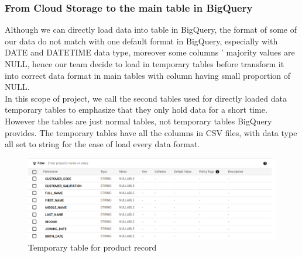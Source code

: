 \subsubsection{From Cloud Storage to the main table in BigQuery}
Although we can directly load data into table in BigQuery, the format of some of our data do not match with one default format in BigQuery, especially with DATE and DATETIME data type, moreover some columns ' majority values are NULL, hence our team decide to load in temporary tables before transform it into correct data format in main tables with column having small proportion of NULL.\\
In this scope of project, we call the second tables used for directly loaded data temporary tables to emphasize that they only hold data for a short time. However the tables are just normal tables, not temporary tables BigQuery provides. The temporary tables have all the columns in CSV files, with data type all set to string for the ease of load every data format. 
\begin{figure}[!h]
    \centering
    \includegraphics[width=0.75\linewidth]{images/temporary_product_table.png}
    \caption{Temporary table for product record }
\end{figure}

